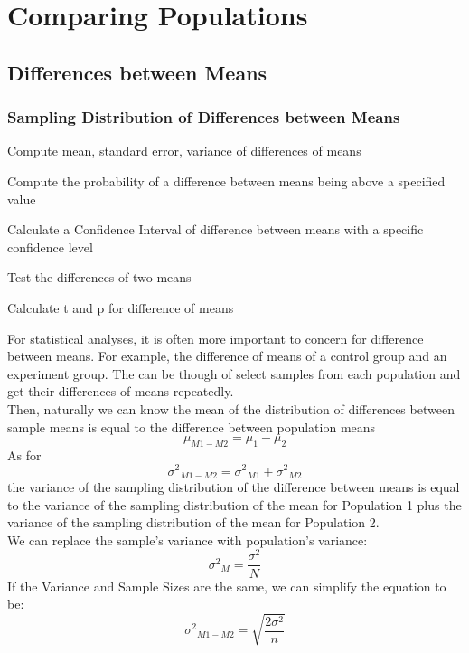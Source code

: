 \section{Comparing Populations}

\subsection{Differences between Means}

\subsubsection{Sampling Distribution of Differences between Means}
\begin{objectives}
    \item Compute mean, standard error, variance of differences of means
    \item Compute the probability of a difference between means being above a specified
    value
    \item Calculate a Confidence Interval of difference between means with a specific confidence level
       \item Test the differences of two means
    \item Calculate t and p for difference of means
\end{objectives}
\vbox{}
For statistical analyses, it is often more important to concern for difference between means. For example, the difference of means of a control group and an experiment group.
The  can be though of select samples from each population and get their differences of means repeatedly.
\vbox{}
\\Then, naturally we can know  the mean of the distribution of differences between sample means
is equal to the difference between population means
\begin{equation}
    \mu_{M1-M2}=\mu_1-\mu_2
\end{equation}
As for 
\begin{equation}
    {\sigma^{2}}_{M1-M2}={\sigma^{2}}_{M1}+{\sigma^{2}}_{M2}
\end{equation}
the variance of the sampling distribution of the difference between
means is equal to the variance of the sampling distribution of the mean for
Population 1 plus the variance of the sampling distribution of the mean for
Population 2.
\\We can replace the sample's variance with population's variance:
\begin{equation}
    {\sigma^{2}}_M=\frac{\sigma^{2}}{N}
\end{equation}
If the Variance and Sample Sizes are the same, we can simplify the equation to be:
\begin{equation}
    {\sigma^{2}}_{M1-M2}=\sqrt{\frac{2\sigma^2}{n}}
\end{equation}

